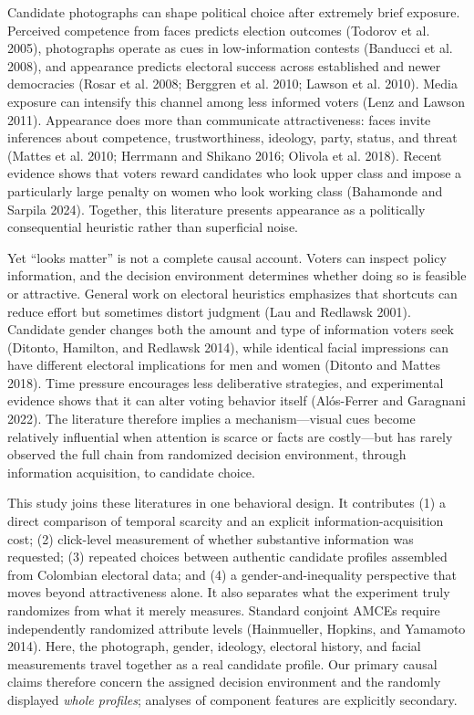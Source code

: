 \documentclass[10pt]{article}
\begin{document}
Candidate photographs can shape political choice after extremely brief exposure. Perceived competence from faces predicts election outcomes (Todorov et al. 2005), photographs operate as cues in low-information contests (Banducci et al. 2008), and appearance predicts electoral success across established and newer democracies (Rosar et al. 2008; Berggren et al. 2010; Lawson et al. 2010). Media exposure can intensify this channel among less informed voters (Lenz and Lawson 2011). Appearance does more than communicate attractiveness: faces invite inferences about competence, trustworthiness, ideology, party, status, and threat (Mattes et al. 2010; Herrmann and Shikano 2016; Olivola et al. 2018). Recent evidence shows that voters reward candidates who look upper class and impose a particularly large penalty on women who look working class (Bahamonde and Sarpila 2024). Together, this literature presents appearance as a politically consequential heuristic rather than superficial noise.

Yet ``looks matter'' is not a complete causal account. Voters can inspect policy information, and the decision environment determines whether doing so is feasible or attractive. General work on electoral heuristics emphasizes that shortcuts can reduce effort but sometimes distort judgment (Lau and Redlawsk 2001). Candidate gender changes both the amount and type of information voters seek (Ditonto, Hamilton, and Redlawsk 2014), while identical facial impressions can have different electoral implications for men and women (Ditonto and Mattes 2018). Time pressure encourages less deliberative strategies, and experimental evidence shows that it can alter voting behavior itself (Al\'os-Ferrer and Garagnani 2022). The literature therefore implies a mechanism---visual cues become relatively influential when attention is scarce or facts are costly---but has rarely observed the full chain from randomized decision environment, through information acquisition, to candidate choice.

This study joins these literatures in one behavioral design. It contributes (1) a direct comparison of temporal scarcity and an explicit information-acquisition cost; (2) click-level measurement of whether substantive information was requested; (3) repeated choices between authentic candidate profiles assembled from Colombian electoral data; and (4) a gender-and-inequality perspective that moves beyond attractiveness alone. It also separates what the experiment truly randomizes from what it merely measures. Standard conjoint AMCEs require independently randomized attribute levels (Hainmueller, Hopkins, and Yamamoto 2014). Here, the photograph, gender, ideology, electoral history, and facial measurements travel together as a real candidate profile. Our primary causal claims therefore concern the assigned decision environment and the randomly displayed \emph{whole profiles}; analyses of component features are explicitly secondary.
\end{document}
